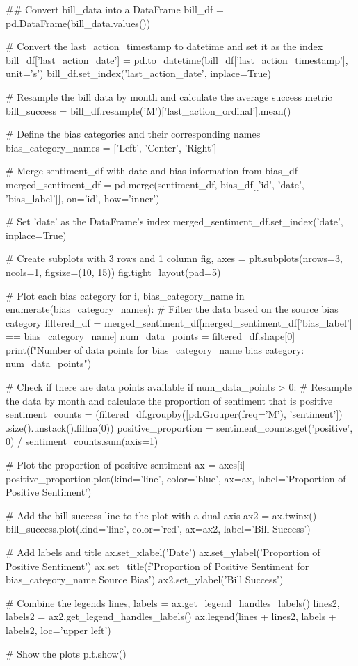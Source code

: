 \begin{pyin}
\## Convert bill_data into a DataFrame
bill_df = pd.DataFrame(bill_data.values())

# Convert the last_action_timestamp to datetime and set it as the index
bill_df['last_action_date'] = pd.to_datetime(bill_df['last_action_timestamp'], unit='s')
bill_df.set_index('last_action_date', inplace=True)

# Resample the bill data by month and calculate the average success metric
bill_success = bill_df.resample('M')['last_action_ordinal'].mean()

# Define the bias categories and their corresponding names
bias_category_names = ['Left', 'Center', 'Right']

# Merge sentiment_df with date and bias information from bias_df
merged_sentiment_df = pd.merge(sentiment_df, bias_df[['id', 'date', 'bias_label']], on='id', how='inner')

# Set 'date' as the DataFrame's index
merged_sentiment_df.set_index('date', inplace=True)

# Create subplots with 3 rows and 1 column
fig, axes = plt.subplots(nrows=3, ncols=1, figsize=(10, 15))
fig.tight_layout(pad=5)

# Plot each bias category
for i, bias_category_name in enumerate(bias_category_names):
    # Filter the data based on the source bias category
    filtered_df = merged_sentiment_df[merged_sentiment_df['bias_label'] == bias_category_name]
    num_data_points = filtered_df.shape[0]
    print(f"Number of data points for {bias_category_name} bias category: {num_data_points}")

    # Check if there are data points available
    if num_data_points > 0:
        # Resample the data by month and calculate the proportion of sentiment that is positive
        sentiment_counts = (filtered_df.groupby([pd.Grouper(freq='M'), 'sentiment'])
                            .size().unstack().fillna(0))
        positive_proportion = sentiment_counts.get('positive', 0) / sentiment_counts.sum(axis=1)

        # Plot the proportion of positive sentiment
        ax = axes[i]
        positive_proportion.plot(kind='line', color='blue', ax=ax, label='Proportion of Positive Sentiment')

        # Add the bill success line to the plot with a dual axis
        ax2 = ax.twinx()
        bill_success.plot(kind='line', color='red', ax=ax2, label='Bill Success')

        # Add labels and title
        ax.set_xlabel('Date')
        ax.set_ylabel('Proportion of Positive Sentiment')
        ax.set_title(f'Proportion of Positive Sentiment for {bias_category_name} Source Bias')
        ax2.set_ylabel('Bill Success')

        # Combine the legends
        lines, labels = ax.get_legend_handles_labels()
        lines2, labels2 = ax2.get_legend_handles_labels()
        ax.legend(lines + lines2, labels + labels2, loc='upper left')

# Show the plots
plt.show()

\end{pyin}

